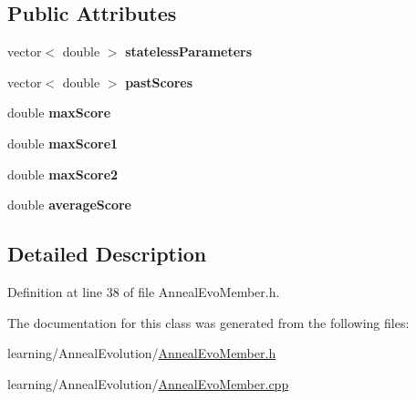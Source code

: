 \subsection*{Public Attributes}
\begin{DoxyCompactItemize}
\item 
\hypertarget{class_anneal_evo_member_abf9bffa087aa6c41375f7d1ef502170a}{vector$<$ double $>$ {\bfseries stateless\-Parameters}}\label{class_anneal_evo_member_abf9bffa087aa6c41375f7d1ef502170a}

\item 
\hypertarget{class_anneal_evo_member_a2b5dcacc081f1ea2ba2bafba95010a86}{vector$<$ double $>$ {\bfseries past\-Scores}}\label{class_anneal_evo_member_a2b5dcacc081f1ea2ba2bafba95010a86}

\item 
\hypertarget{class_anneal_evo_member_a3093f82effd3f947d2db9b09c5e5ed37}{double {\bfseries max\-Score}}\label{class_anneal_evo_member_a3093f82effd3f947d2db9b09c5e5ed37}

\item 
\hypertarget{class_anneal_evo_member_ad23339b2ffeb17f5daa3a82786087814}{double {\bfseries max\-Score1}}\label{class_anneal_evo_member_ad23339b2ffeb17f5daa3a82786087814}

\item 
\hypertarget{class_anneal_evo_member_a1de41ae7ca5d0763951807dc506ae9f5}{double {\bfseries max\-Score2}}\label{class_anneal_evo_member_a1de41ae7ca5d0763951807dc506ae9f5}

\item 
\hypertarget{class_anneal_evo_member_ac2acebeffb03591d4439ce6420691535}{double {\bfseries average\-Score}}\label{class_anneal_evo_member_ac2acebeffb03591d4439ce6420691535}

\end{DoxyCompactItemize}


\subsection{Detailed Description}


Definition at line 38 of file Anneal\-Evo\-Member.\-h.



The documentation for this class was generated from the following files\-:\begin{DoxyCompactItemize}
\item 
learning/\-Anneal\-Evolution/\hyperlink{_anneal_evo_member_8h}{Anneal\-Evo\-Member.\-h}\item 
learning/\-Anneal\-Evolution/\hyperlink{_anneal_evo_member_8cpp}{Anneal\-Evo\-Member.\-cpp}\end{DoxyCompactItemize}
